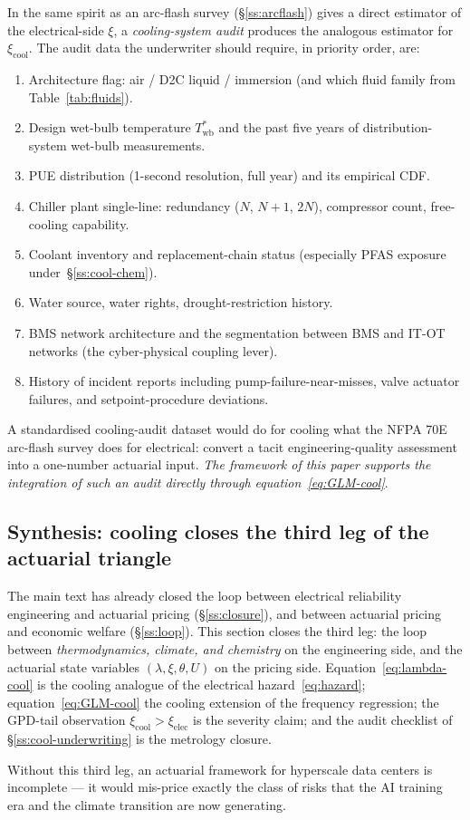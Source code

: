 In the same spirit as an arc-flash survey (\S\ref{ss:arcflash})
gives a direct estimator of the electrical-side $\xi$, a
\emph{cooling-system audit} produces the analogous estimator for
$\xi_{\mathrm{cool}}$. The audit data the underwriter should
require, in priority order, are:

\begin{enumerate}[leftmargin=*,nosep,topsep=4pt]
   \item Architecture flag: air / D2C liquid / immersion (and which
         fluid family from Table~\ref{tab:fluids}).
   \item Design wet-bulb temperature $T^*_{\mathrm{wb}}$ and the past
         five years of distribution-system wet-bulb measurements.
   \item PUE distribution (1-second resolution, full year) and its
         empirical CDF.
   \item Chiller plant single-line: redundancy ($N$, $N+1$, $2N$),
         compressor count, free-cooling capability.
   \item Coolant inventory and replacement-chain status (especially
         PFAS exposure under~\S\ref{ss:cool-chem}).
   \item Water source, water rights, drought-restriction history.
   \item BMS network architecture and the segmentation between BMS
         and IT-OT networks (the cyber-physical coupling lever).
   \item History of incident reports including
         pump-failure-near-misses, valve actuator failures, and
         setpoint-procedure deviations.
\end{enumerate}

A standardised cooling-audit dataset would do for cooling what the
NFPA 70E arc-flash survey does for electrical: convert a tacit
engineering-quality assessment into a one-number actuarial input.
\emph{The framework of this paper supports the integration of such an
audit directly through equation~\eqref{eq:GLM-cool}}.

\subsection{Synthesis: cooling closes the third leg of the actuarial triangle}\label{ss:cool-synth}

The main text has already closed the loop between electrical
reliability engineering and actuarial pricing
(\S\ref{ss:closure}), and between actuarial pricing and economic
welfare (\S\ref{ss:loop}). This section closes the third leg: the
loop between \emph{thermodynamics, climate, and chemistry} on the
engineering side, and the actuarial state variables $(\lambda, \xi,
\theta, U)$ on the pricing side. Equation~\eqref{eq:lambda-cool} is
the cooling analogue of the electrical hazard~\eqref{eq:hazard};
equation~\eqref{eq:GLM-cool} the cooling extension of the frequency
regression; the GPD-tail observation $\xi_{\mathrm{cool}}>\xi_{\mathrm{elec}}$
is the severity claim; and the audit checklist of
\S\ref{ss:cool-underwriting} is the metrology closure.

Without this third leg, an actuarial framework for hyperscale data
centers is incomplete --- it would mis-price exactly the class of
risks that the AI training era and the climate transition are now
generating.

